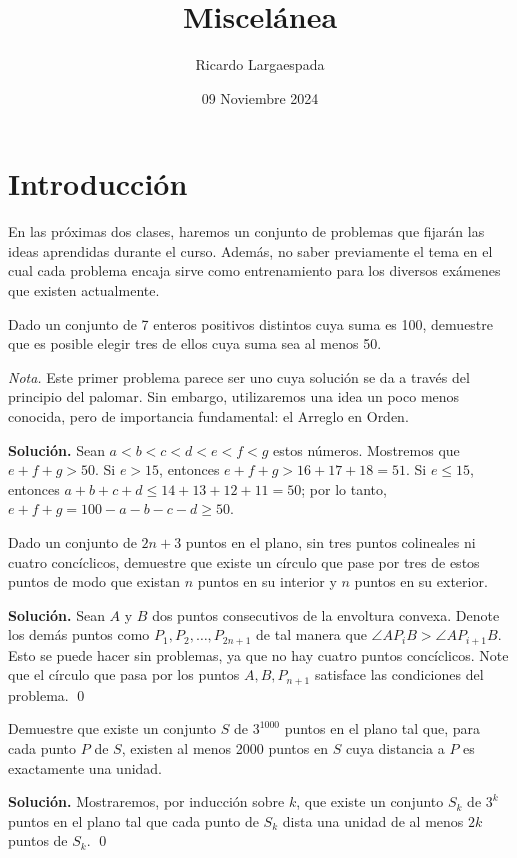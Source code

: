\documentclass[11pt]{scrartcl}
\begin{document}
\title{Miscelánea}
\author{Ricardo Largaespada}
\date{09 Noviembre 2024}

\maketitle

\section{Introducción}

En las próximas dos clases, haremos un conjunto de problemas que fijarán las ideas aprendidas durante el curso. Además, no saber previamente el tema en el cual cada problema encaja sirve como entrenamiento para los diversos exámenes que existen actualmente.

\begin{example}
Dado un conjunto de 7 enteros positivos distintos cuya suma es 100, demuestre que es posible elegir tres de ellos cuya suma sea al menos 50.
\end{example}
\textit{Nota.} Este primer problema parece ser uno cuya solución se da a través del principio del palomar. Sin embargo, utilizaremos una idea un poco menos conocida, pero de importancia fundamental: el Arreglo en Orden.

\textbf{Solución.} Sean \( a < b < c < d < e < f < g \) estos números. Mostremos que \( e + f + g > 50 \). Si \( e > 15 \), entonces \( e + f + g > 16 + 17 + 18 = 51 \). Si \( e \leq 15 \), entonces \( a + b + c + d \leq 14 + 13 + 12 + 11 = 50 \); por lo tanto, \( e + f + g = 100 - a - b - c - d \geq 50 \).

\begin{example}
Dado un conjunto de \( 2n + 3 \) puntos en el plano, sin tres puntos colineales ni cuatro concíclicos, demuestre que existe un círculo que pase por tres de estos puntos de modo que existan \( n \) puntos en su interior y \( n \) puntos en su exterior.
\end{example}
\textbf{Solución.} Sean \( A \) y \( B \) dos puntos consecutivos de la envoltura convexa. Denote los demás puntos como \( P_1, P_2, \ldots, P_{2n+1} \) de tal manera que \( \angle AP_i B > \angle AP_{i+1} B \). Esto se puede hacer sin problemas, ya que no hay cuatro puntos concíclicos. Note que el círculo que pasa por los puntos \( A, B, P_{n+1} \) satisface las condiciones del problema. \qed

\begin{example}
Demuestre que existe un conjunto \( S \) de \( 3^{1000} \) puntos en el plano tal que, para cada punto \( P \) de \( S \), existen al menos 2000 puntos en \( S \) cuya distancia a \( P \) es exactamente una unidad.
\end{example}
\textbf{Solución.} Mostraremos, por inducción sobre \( k \), que existe un conjunto \( S_k \) de \( 3^k \) puntos en el plano tal que cada punto de \( S_k \) dista una unidad de al menos \( 2k \) puntos de \( S_k \). \qed
\end{document}
